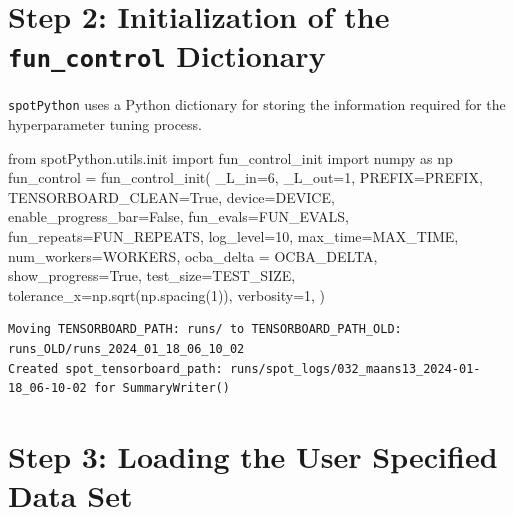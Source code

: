 \documentclass[
  letterpaper,
  DIV=11,
  numbers=noendperiod]{scrreprt}
\newenvironment{Shaded}{\begin{snugshade}}{\end{snugshade}}
\newcommand{\DecValTok}[1]{\textcolor[rgb]{0.68,0.00,0.00}{#1}}
\newcommand{\ImportTok}[1]{\textcolor[rgb]{0.00,0.46,0.62}{#1}}
\newcommand{\NormalTok}[1]{\textcolor[rgb]{0.00,0.23,0.31}{#1}}
\newcommand{\OperatorTok}[1]{\textcolor[rgb]{0.37,0.37,0.37}{#1}}
\newcommand{\VariableTok}[1]{\textcolor[rgb]{0.07,0.07,0.07}{#1}}
\begin{document}
\section{\texorpdfstring{Step 2: Initialization of the
\texttt{fun\_control}
Dictionary}{Step 2: Initialization of the fun\_control Dictionary}}\label{step-2-initialization-of-the-fun_control-dictionary-2}

\texttt{spotPython} uses a Python dictionary for storing the information
required for the hyperparameter tuning process.

\begin{Shaded}
\begin{Highlighting}[]
\ImportTok{from}\NormalTok{ spotPython.utils.init }\ImportTok{import}\NormalTok{ fun\_control\_init}
\ImportTok{import}\NormalTok{ numpy }\ImportTok{as}\NormalTok{ np}
\NormalTok{fun\_control }\OperatorTok{=}\NormalTok{ fun\_control\_init(}
\NormalTok{    \_L\_in}\OperatorTok{=}\DecValTok{6}\NormalTok{,}
\NormalTok{    \_L\_out}\OperatorTok{=}\DecValTok{1}\NormalTok{,}
\NormalTok{    PREFIX}\OperatorTok{=}\NormalTok{PREFIX,}
\NormalTok{    TENSORBOARD\_CLEAN}\OperatorTok{=}\VariableTok{True}\NormalTok{,}
\NormalTok{    device}\OperatorTok{=}\NormalTok{DEVICE,}
\NormalTok{    enable\_progress\_bar}\OperatorTok{=}\VariableTok{False}\NormalTok{,}
\NormalTok{    fun\_evals}\OperatorTok{=}\NormalTok{FUN\_EVALS,}
\NormalTok{    fun\_repeats}\OperatorTok{=}\NormalTok{FUN\_REPEATS,}
\NormalTok{    log\_level}\OperatorTok{=}\DecValTok{10}\NormalTok{,}
\NormalTok{    max\_time}\OperatorTok{=}\NormalTok{MAX\_TIME,}
\NormalTok{    num\_workers}\OperatorTok{=}\NormalTok{WORKERS,}
\NormalTok{    ocba\_delta }\OperatorTok{=}\NormalTok{ OCBA\_DELTA,}
\NormalTok{    show\_progress}\OperatorTok{=}\VariableTok{True}\NormalTok{,}
\NormalTok{    test\_size}\OperatorTok{=}\NormalTok{TEST\_SIZE,}
\NormalTok{    tolerance\_x}\OperatorTok{=}\NormalTok{np.sqrt(np.spacing(}\DecValTok{1}\NormalTok{)),}
\NormalTok{    verbosity}\OperatorTok{=}\DecValTok{1}\NormalTok{,}
\NormalTok{    )}
\end{Highlighting}
\end{Shaded}

\begin{verbatim}
Moving TENSORBOARD_PATH: runs/ to TENSORBOARD_PATH_OLD: runs_OLD/runs_2024_01_18_06_10_02
Created spot_tensorboard_path: runs/spot_logs/032_maans13_2024-01-18_06-10-02 for SummaryWriter()
\end{verbatim}

\section{Step 3: Loading the User Specified Data
Set}\label{step-3-loading-the-user-specified-data-set}
\end{document}
